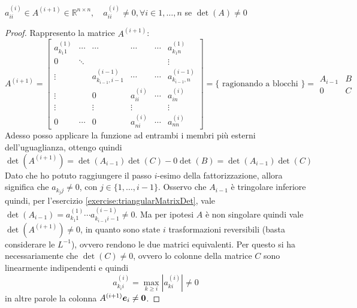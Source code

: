 \begin{exercise}[3.19]
$a^{(i)}_{ii} \in A^{(i+1)} \in \mathbb{R}^{n \times n}, \quad a^{(i)}_{ii} \not
= 0, \forall i \in {1, \ldots, n}$ se $\det(A) \not = 0$
\end{exercise}
\begin{proof}
Rappresento la matrice $A^{(i+1)}$:	
\begin{displaymath}
A^{(i+1)} = \begin{bmatrix}
a_{k_{1} 1}^{(1)} & \cdots & \cdots &\cdots &\cdots & a_{k_{1} n}^{(1)} \\
0 & \ddots &		&	 &	& \vdots\\
\vdots &  		& a_{k_{i-1}, i-1}^{(i-1)} & 	\cdots	& \cdots & a_{k_{i-1},
n}^{(i-1)}\\ 
\vdots & 		&	0	&	a_{ii}^{(i)}	& \cdots & a_{in}^{(i)}\\
\vdots & 		& \vdots		& \vdots & &\vdots\\
0	   & \cdots & 0 	& a_{ni}^{(i)} &\cdots & a_{nn}^{(i)}
\end{bmatrix} = \lbrace \text{ ragionando a blocchi } \rbrace =  
\begin{array}{c|c}
A_{i-1} & B \\
\hline
0		& C
\end{array}
\end{displaymath}
Adesso posso applicare la funzione ad entrambi i membri pi\`u esterni
dell'uguaglianza, ottengo quindi 
\begin{displaymath}
\det(A^{(i+1)}) = \det(A_{i-1})\det(C) -
0\det(B) = \det(A_{i-1})\det(C)
\end{displaymath}
Dato che ho potuto raggiungere il passo $i$-esimo della fattorizzazione, allora
significa che $a_{k_{j} j} \not = 0$, con $j \in \lbrace 1, \ldots, i-1
\rbrace$. Osservo che $A_{i-1}$ \`e tringolare inferiore quindi, per l'esercizio 
\ref{exercise:triangularMatrixDet}, vale $\det(A_{i-1}) = a_{k_{1}1}^{(1)}
\cdots a_{k_{i-1} i-1}^{(i-1)} \not = 0$. Ma per ipotesi $A$ \`e
non singolare quindi vale $\det(A^{(i+1)}) \not = 0$, in quanto sono state $i$
trasformazioni reversibili (basta considerare le $L^{-1}$), ovvero rendono le
due matrici equivalenti. Per questo si ha necessariamente che $\det(C) \not =
0$, ovvero lo colonne della matrice $C$ sono linearmente indipendenti e quindi
\begin{displaymath}
a_{k_{i}i}^{(i)} = \max_{k \geq i}{|a_{ki}^{(i)}|} \not = 0
\end{displaymath}
in altre parole la colonna $A^{(i+1)}\boldsymbol{e}_{i} \not = \boldsymbol{0}$.
\end{proof}

